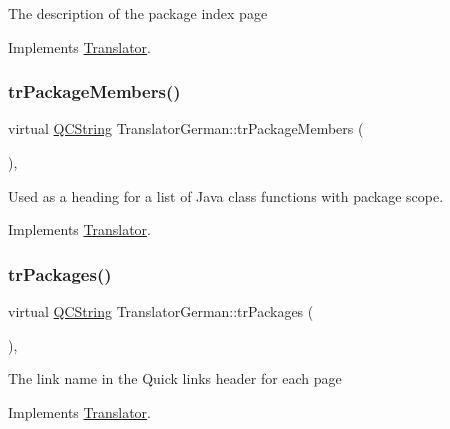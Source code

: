 The description of the package index page 

Implements \mbox{\hyperlink{class_translator}{Translator}}.

\mbox{\label{class_translator_german_a912a4c5282707e68bdb23feea2de33cf}} 
\subsubsection{\texorpdfstring{trPackageMembers()}{trPackageMembers()}}
{\footnotesize\ttfamily virtual \mbox{\hyperlink{class_q_c_string}{Q\+C\+String}} Translator\+German\+::tr\+Package\+Members (\begin{DoxyParamCaption}{ }\end{DoxyParamCaption})\hspace{0.3cm}{\ttfamily [inline]}, {\ttfamily [virtual]}}

Used as a heading for a list of Java class functions with package scope. 

Implements \mbox{\hyperlink{class_translator}{Translator}}.

\mbox{\label{class_translator_german_a1d76487fc4e16b36bd3d390de59487e8}} 
\subsubsection{\texorpdfstring{trPackages()}{trPackages()}}
{\footnotesize\ttfamily virtual \mbox{\hyperlink{class_q_c_string}{Q\+C\+String}} Translator\+German\+::tr\+Packages (\begin{DoxyParamCaption}{ }\end{DoxyParamCaption})\hspace{0.3cm}{\ttfamily [inline]}, {\ttfamily [virtual]}}

The link name in the Quick links header for each page 

Implements \mbox{\hyperlink{class_translator}{Translator}}.

\mbox{\label{class_translator_german_af2a3877544d6ee6b4bf5a812c236c93b}} 
